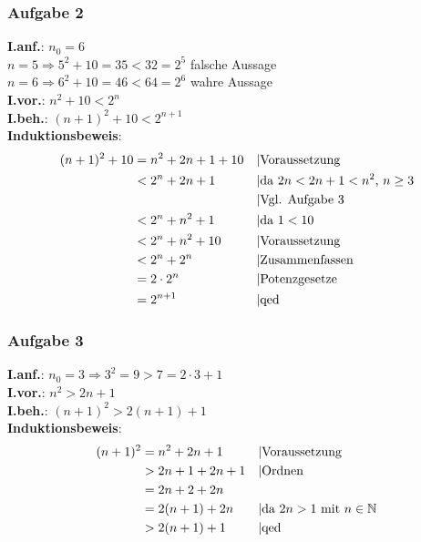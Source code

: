 \subsubsection{Aufgabe 2}
\textbf{I.anf.}: $ n_0 = 6 $\\
	\quad $ n = 5 \Rightarrow 5^2+10 = 35 < 32 = 2^5 $ falsche Aussage\\
	\quad $ n = 6 \Rightarrow 6^2+10=46 <64 =2^6 $ wahre Aussage \\
\textbf{I.vor.}: $ n^2 + 10 < 2^n $\\
\textbf{I.beh.}: $ (n+1)^2 + 10 < 2^{n+1} $\\
\textbf{Induktionsbeweis}: \begin{align*}
(n+1)^2 + 10 &= n^2 + 2n + 1 + 10 && \text{\textbar Voraussetzung}\\
							&< 2^n + 2n + 1 		&& \text{\textbar da $2n<2n+1<n^2$, $n\geq3$}\\
							&										&& \text{\textbar Vgl. Aufgabe 3}\\
							&< 2^n + n^2 + 1 		&& \text{\textbar da $1<10$}\\
							&< 2^n + n^2 + 10 	&& \text{\textbar Voraussetzung}\\
							&< 2^n + 2^n 				&& \text{\textbar Zusammenfassen}\\
							&= 2 \cdot 2^n 			&& \text{\textbar Potenzgesetze}\\
							&= 2^{n+1} 					&& \text{\textbar qed}\end{align*}	
\subsubsection{Aufgabe 3}
\textbf{I.anf.}: $ n_0 = 3 \Rightarrow 3^2 = 9 > 7 = 2\cdot3+1$\\
\textbf{I.vor.}: $ n^2 > 2n + 1 $\\
\textbf{I.beh.}: $ (n+1)^2 > 2(n+1) + 1 $\\
\textbf{Induktionsbeweis}:\begin{align*} 
(n+1)^2 &= n^2 + 2n + 1 && \text{\textbar Voraussetzung}\\
				&> 2n + 1 + 2n + 1 && \text{\textbar Ordnen}\\
				&= 2n + 2 + 2n \\
				&= 2(n+1) + 2n && \text{\textbar da $2n>1$ mit $n \in \mathbb{N}$}\\
				&> 2(n+1) + 1 && \text{\textbar qed}\end{align*}	
